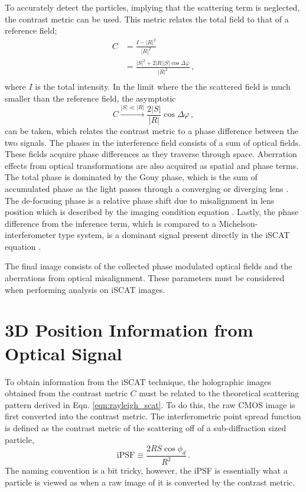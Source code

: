 To accurately detect the particles, implying that the scattering term is neglected, the contrast metric can be used. This metric relates the total field to that of a reference field; 
\begin{equation}
    \begin{aligned}
        C &= \frac{I - |R|^2}{|R|^2} \\
        &= \frac{|S|^2 + 2|R||S|\cos \Delta \varphi}{|R|^2}\,, \\
    \end{aligned} 
\end{equation}
where $I$ is the total intensity. In the limit where the the scattered field is much smaller than the reference field, the asymptotic
\begin{equation}
    C \xrightarrow{|S| \ll |R|} \frac{2|S|}{|R|}\cos\Delta \varphi\,,
\end{equation}
can be taken, which relates the contrast metric to a phase difference between the two signals. The phases in the interference field consists of a sum of optical fields. These fields acquire phase differences as they traverse through space. Aberration effects from optical transformations are also acquired as spatial and phase terms. The total phase is dominated by the Gouy phase, which is the sum of accumulated phase as the light passes through a converging or diverging lens \cite{taylor_interferometric_2018}. The de-focusing phase is a relative phase shift due to misalignment in lens position which is described by the imaging condition equation \cite{Steck2021}. Lastly, the phase difference from the inference term, which is compared to a Michelson-interferometer type system, is a dominant signal present directly in the iSCAT equation \cite{taylor_interferometric_2018}. 

The final image consists of the collected phase modulated optical fields and the aberrations from optical misalignment. These parameters must be considered when performing analysis on iSCAT images.

\clearpage
\section{3D Position Information from Optical Signal}

To obtain information from the iSCAT technique, the holographic images obtained from the contrast metric $C$ must be related to the theoretical scattering pattern derived in Eqn. \ref{eqn:rayleigh_scat}. To do this, the raw CMOS image is first converted into the contrast metric. The interferometric point spread function is defined as the contrast metric of the scattering off of a sub-diffraction sized particle, 
\begin{equation}
    \mathrm{iPSF} \equiv \frac{2R S \cos\phi_d}{R^2}\,.
\end{equation}
The naming convention is a bit tricky, however, the iPSF is essentially what a particle is viewed as when a raw image of it is converted by the contrast metric. 

